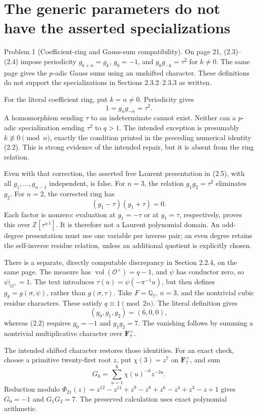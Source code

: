\documentclass[10pt]{article}
\begin{document}
\section*{The generic parameters do not have the asserted specializations}
Problem 1 (Coefficient-ring and Gauss-sum compatibility).  On page 21, (2.3)–(2.4) impose periodicity \(g_{k+n}=g_k\), \(g_0=-1\), and \(g_kg_{-k}=\tau^2\) for \(k\ne0\). The same page gives the \(p\)-adic Gauss sums using an unshifted character. These definitions do not support the specializations in Sections 2.3.2–2.3.3 as written.\par
For the literal coefficient ring, put \(k=n\ne0\). Periodicity gives \[1=g_ng_{-n}=\tau^2.\] A homomorphism sending \(\tau\) to an indeterminate cannot exist. Neither can a \(p\)-adic specialization sending \(\tau^2\) to \(q>1\). The intended exception is presumably \(k\not\equiv0\pmod n\), exactly the condition printed in the preceding numerical identity (2.2). This is strong evidence of the intended repair, but it is absent from the ring relation.\par
Even with that correction, the asserted free Laurent presentation in (2.5), with all \(g_1,\ldots,g_{n-1}\) independent, is false. For \(n=3\), the relation \(g_1g_2=\tau^2\) eliminates \(g_2\). For \(n=2\), the corrected ring has \[(g_1-\tau)(g_1+\tau)=0.\] Each factor is nonzero: evaluation at \(g_1=-\tau\) or at \(g_1=\tau\), respectively, proves this over \(\mathbb Z[\tau^{\pm1}]\). It is therefore not a Laurent polynomial domain. An odd-degree presentation must use one variable per inverse pair; an even degree retains the self-inverse residue relation, unless an additional quotient is explicitly chosen.\par
There is a separate, directly computable discrepancy in Section 2.2.4, on the same page. The measure has \(\operatorname{vol}(\mathcal O^\times)=q-1\), and \(\psi\) has conductor zero, so \(\psi|_{\mathcal O^\times}=1\). The text introduces \(\tau(u)=\psi(-\pi^{-1}u)\), but then defines \(g_k=g(\sigma,\psi)\), rather than \(g(\sigma,\tau)\). Take \(F=\mathbb Q_7\), \(n=3\), and the nontrivial cubic residue characters. These satisfy \(q\equiv1\pmod{2n}\). The literal definition gives \[(g_0,g_1,g_2)=(6,0,0),\] whereas (2.2) requires \(g_0=-1\) and \(g_1g_2=7\). The vanishing follows by summing a nontrivial multiplicative character over \(\mathbf F_7^\times\).\par
The intended shifted character restores those identities. For an exact check, choose a primitive twenty-first root \(z\), put \(\chi(3)=z^7\) on \(\mathbf F_7^\times\), and sum \[G_k=\sum_{u=1}^6\chi(u)^{-k}z^{-3u}.\] Reduction modulo \(\Phi_{21}(z)=z^{12}-z^{11}+z^9-z^8+z^6-z^4+z^3-z+1\) gives \(G_0=-1\) and \(G_1G_2=7\). The preserved calculation uses exact polynomial arithmetic.\par
\end{document}
